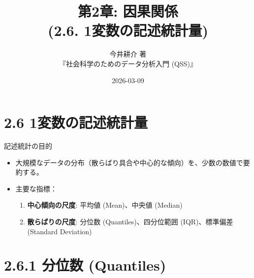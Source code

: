 \documentclass[
  ignorenonframetext,
]{beamer}
\title{第2章: 因果関係\\
(2.6. 1変数の記述統計量)}
\subtitle{今井耕介 著\\
『社会科学のためのデータ分析入門 (QSS)』}
\author{}
\date{\vspace{-2.5em}2026-03-09}
\providecommand{\tightlist}{%
  \setlength{\itemsep}{0pt}\setlength{\parskip}{0pt}}
\begin{document}
\frame{\titlepage}

\hypertarget{ux5909ux6570ux306eux8a18ux8ff0ux7d71ux8a08ux91cf}{%
\section{2.6
1変数の記述統計量}\label{ux5909ux6570ux306eux8a18ux8ff0ux7d71ux8a08ux91cf}}

\begin{frame}{記述統計の目的}
\protect\hypertarget{ux8a18ux8ff0ux7d71ux8a08ux306eux76eeux7684}{}
\begin{itemize}
\tightlist
\item
  大規模なデータの分布（散らばり具合や中心的な傾向）を、少数の数値で要約する。
\item
  主要な指標：

  \begin{enumerate}
  \tightlist
  \item
    \textbf{中心傾向の尺度}: 平均値 (Mean)、中央値 (Median)
  \item
    \textbf{散らばりの尺度}: 分位数 (Quantiles)、四分位範囲
    (IQR)、標準偏差 (Standard Deviation)
  \end{enumerate}
\end{itemize}
\end{frame}

\hypertarget{ux5206ux4f4dux6570-quantiles}{%
\section{2.6.1 分位数 (Quantiles)}\label{ux5206ux4f4dux6570-quantiles}}
\end{document}
